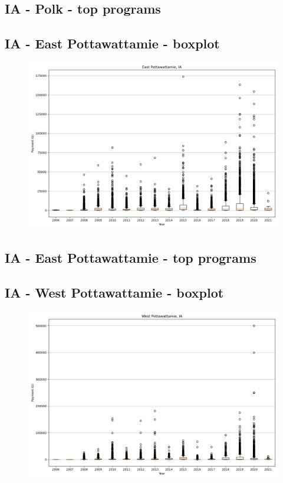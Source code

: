 \subsection*{IA - Polk - top programs}

\newpage
\subsection*{IA - East Pottawattamie - boxplot}
\begin{figure}[h]
\centering
\includegraphics[width=7in]{../output/boxplots/counties/East Pottawattamie-IA_boxplot.png}
\end{figure}


\subsection*{IA - East Pottawattamie - top programs}

\newpage
\subsection*{IA - West Pottawattamie - boxplot}
\begin{figure}[h]
\centering
\includegraphics[width=7in]{../output/boxplots/counties/West Pottawattamie-IA_boxplot.png}
\end{figure}


